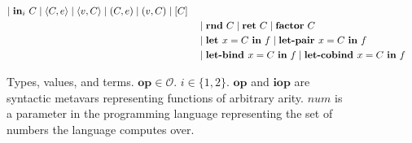 \begin{figure}[tbp]
\begin{alignat*}{3}
         \mid \mathbf{in}_i~C
         \mid \langle C, e \rangle
         \mid \langle v, C \rangle
         \mid (C, e)
         \mid (v, C)
         \mid [ C ] \\
         & & &
         \mid \mathbf{rnd}~C 
         \mid \mathbf{ret}~C 
         \mid \mathbf{factor}~C \\ 
         & & &
         \mid \textbf{let } x = C \ \textbf{in} \ f
         \mid \textbf{let-pair } x = C \ \textbf{in} \ f \\
         & & &
         \mid \textbf{let-bind } x = C \ \textbf{in} \ f
         \mid \textbf{let-cobind } x = C \ \textbf{in} \ f \\
  \end{alignat*}
  \caption{
    Types, values, and terms. $\mathbf{op} \in \mathcal{O}$. $i \in \{1, 2\}$.
    $\textbf{op}$ and $\textbf{iop}$ are syntactic metavars representing
    functions of arbitrary arity.
    $\textit{num}$ is a parameter in the programming language representing the
    set of numbers the language computes over.
  }
  \label{fig:syntax}
\end{figure}
